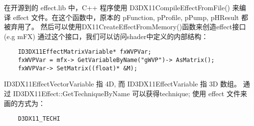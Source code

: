 \documentclass[10pt, a4paper]{article}
\begin{document}
    在开源到的 effect.lib 中，C++ 程序使用 D3DX11CompileEffectFromFile() 来编译 effect 文件。在这个函数中，原本的 pFunction, pProfile, pPump, pHResult 都被弃用了。 然后可以使用DX11CreateEffectFromMemory()函数来创造effect接口(e.g mFX) 通过这个接口，我们可以访问shader中定义的内部结构：
\begin{lstlisting}
    ID3DX11EffectMatrixVariable* fxWVPVar; 
    fxWVPVar = mfx-> GetVariableByName("gWVP")-> AsMatrix();
    fxWVPVar-> SetMatrix((float)* &M);
\end{lstlisting}

    ID3DX11EffectVectorVariable 指 4D, 而 ID3DX11EffectVariable 指 3D 数组。 通过 ID3DX11Effect::GetTechniqueByName 可以获得technique; 使用 effect 文件来画的方式为： 
\begin{lstlisting}
    D3DX11_TECHI
\end{lstlisting}
\end{document}
